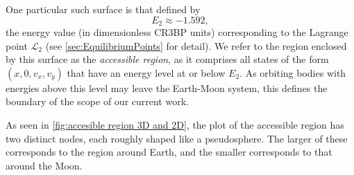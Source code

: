     

    One particular such surface is that defined by
    \begin{equation} \label{eq: energy E2}
        E_2 \approx -1.592,
    \end{equation}
    the energy value (in dimensionless CR3BP units) corresponding to the Lagrange point $\mathcal{L}_2$ (see \cref{sec:EquilibriumPoints} for detail). We refer to the region enclosed by this surface as the \textit{accessible region}, as it comprises all states of the form $(x,0,v_x,v_y)$ that have an energy level at or below $E_2$. 
    As orbiting bodies with energies above this level may leave the Earth-Moon system, this defines the boundary of the scope of our current work.


    

    As seen in \cref{fig:accesible region 3D and 2D}, the plot of the accessible region has two distinct nodes, each roughly shaped like a pseudosphere. The larger of these corresponds to the region around Earth, and the smaller corresponds to that around the Moon.

    


    






















    

